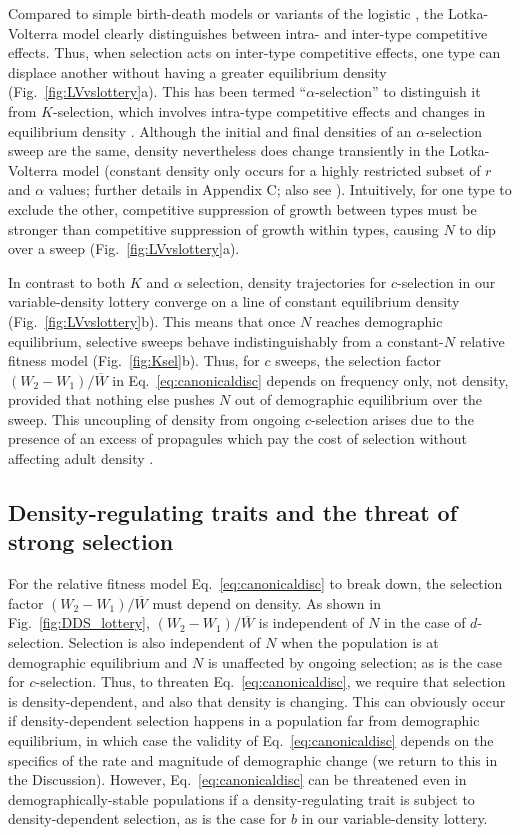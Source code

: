 \documentclass[12pt]{article}
\begin{document}
Compared to simple birth-death models \citep{kostitzin_1939} or variants of the logistic \citep{roughgarden_1979}, the Lotka-Volterra model clearly distinguishes between intra- and inter-type competitive effects. Thus, when selection acts on inter-type competitive effects, one type can displace another without having a greater equilibrium density (Fig.~\ref{fig:LVvslottery}a). This has been termed ``$\alpha$-selection'' to distinguish it from $K$-selection, which involves intra-type competitive effects and changes in equilibrium density \cite{gill_1974,joshi_2001}. Although the initial and final densities of an $\alpha$-selection sweep are the same, density nevertheless does change transiently in the Lotka-Volterra model (constant density only occurs for a highly restricted subset of $r$ and $\alpha$ values; further details in Appendix C; also see \citealt{mallet_2012,smouse_1976}). Intuitively, for one type to exclude the other, competitive suppression of growth between types must be stronger than competitive suppression of growth within types, causing $N$ to dip over a sweep (Fig.~\ref{fig:LVvslottery}a). 

In contrast to both $K$ and $\alpha$ selection, density trajectories for $c$-selection in our variable-density lottery converge on a line of constant equilibrium density (Fig.~\ref{fig:LVvslottery}b). This means that once $N$ reaches demographic equilibrium, selective sweeps behave indistinguishably from a constant-$N$ relative fitness model (Fig.~\ref{fig:Ksel}b). Thus, for $c$ sweeps, the selection factor $(W_2-W_1)/\overline{W}$ in Eq.~\eqref{eq:canonicaldisc} depends on frequency only, not density, provided that nothing else pushes $N$ out of demographic equilibrium over the sweep. This uncoupling of density from ongoing $c$-selection arises due to the presence of an excess of propagules which pay the cost of selection without affecting adult density \citep{nei1971fertility}. 

\subsection*{Density-regulating traits and the threat of strong selection}

For the relative fitness model Eq.~\eqref{eq:canonicaldisc} to break down, the selection factor $(W_2-W_1)/\overline{W}$ must depend on density. As shown in Fig.~\ref{fig:DDS_lottery}, $(W_2-W_1)/\overline{W}$ is independent of $N$ in the case of $d$-selection. Selection is also independent of $N$ when the population is at demographic equilibrium and $N$ is unaffected by ongoing selection; as is the case for $c$-selection. Thus, to threaten Eq.~\eqref{eq:canonicaldisc}, we require that selection is density-dependent, and also that density is changing. This can obviously occur if density-dependent selection happens in a population far from demographic equilibrium, in which case the validity of Eq.~\eqref{eq:canonicaldisc} depends on the specifics of the rate and magnitude of demographic change (we return to this in the Discussion). However, Eq.~\eqref{eq:canonicaldisc} can be threatened even in demographically-stable populations if a density-regulating trait is subject to density-dependent selection, as is the case for $b$ in our variable-density lottery. 
\end{document}
